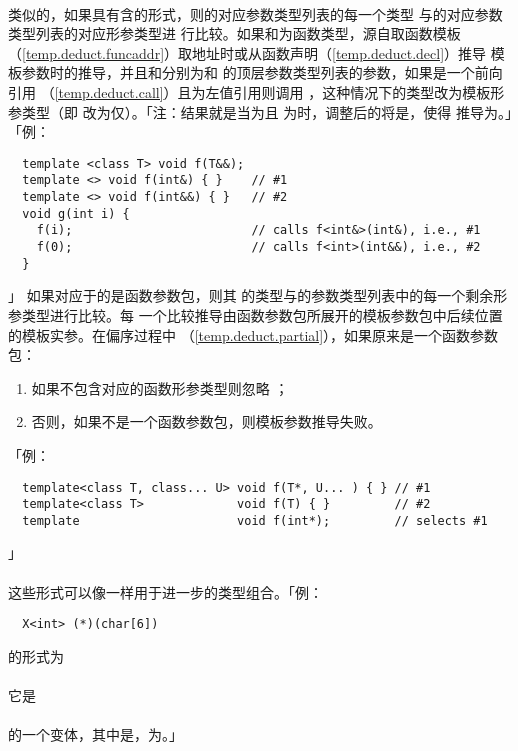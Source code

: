 \paragraph{}
类似的，如果具有含的形式，则的对应参数类型列表的每一个类型
与的对应参数类型列表的对应形参类型进
行比较。如果和为函数类型，源自取函数模板
（\ref{temp.deduct.funcaddr}）取地址时或从函数声明（\ref{temp.deduct.decl}）推导
模板参数时的推导，并且和分别为和
的顶层参数类型列表的参数，如果是一个前向引用
（\ref{temp.deduct.call}）且为左值引用则调用
，这种情况下的类型改为模板形参类型（即
改为仅）。「注：结果就是当为且
为时，调整后的将是，使得
推导为。」「例：
\begin{lstlisting}
  template <class T> void f(T&&);
  template <> void f(int&) { }    // #1
  template <> void f(int&&) { }   // #2
  void g(int i) {
    f(i);                         // calls f<int&>(int&), i.e., #1
    f(0);                         // calls f<int>(int&&), i.e., #2
  }
\end{lstlisting}」
如果对应于的是函数参数包，则其
的类型与的参数类型列表中的每一个剩余形参类型进行比较。每
一个比较推导由函数参数包所展开的模板参数包中后续位置的模板实参。在偏序过程中
（\ref{temp.deduct.partial}），如果原来是一个函数参数包：
\begin{enumerate}
  \item{如果不包含对应的函数形参类型则忽略
    ；}
  \item{否则，如果不是一个函数参数包，则模板参数推导失败。}
\end{enumerate}
「例：
\begin{lstlisting}
  template<class T, class... U> void f(T*, U... ) { } // #1
  template<class T>             void f(T) { }         // #2
  template                      void f(int*);         // selects #1
\end{lstlisting}」

\paragraph{}
这些形式可以像一样用于进一步的类型组合。「例：
\begin{lstlisting}
  X<int> (*)(char[6])
\end{lstlisting}
的形式为                                                                      \\
\mbox{}              \\
它是                                                                          \\
\mbox{}                                          \\
的一个变体，其中是，为。」

